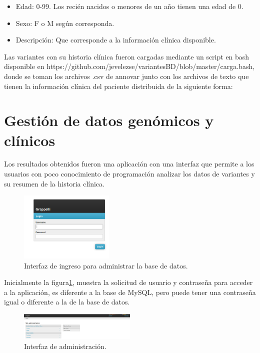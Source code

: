 \begin{itemize}
	\item Edad: 0-99. Los recién nacidos  o menores de un año tienen una edad de 0.
	\item Sexo: F o M según corresponda.
	\item Descripción: Que corresponde a la información clínica disponible.
\end{itemize} 


Las variantes con su historia clínica fueron cargadas mediante un script en bash disponible en https://github.com/jevelezse/variantesBD/blob/master/carga.bash, donde se toman los archivos .csv de annovar junto con los archivos de texto que tienen la información clínica del paciente distribuida de la siguiente forma:

\section{Gestión de datos genómicos y clínicos}

Los resultados obtenidos fueron una aplicación con una interfaz que permite a los usuarios con poco conocimiento de  programación  analizar los datos de variantes y su resumen de la historia clínica. \\

\begin{figure}[h] 
	\centering
	\includegraphics[width=0.4\textwidth]{Kap3/admin_django}
	\caption{Interfaz de ingreso para  administrar la base de datos.} \label{fig:admin}
\end{figure}

Inicialmente la figura\ref{fig:admin}, muestra la solicitud de usuario y contraseña para acceder a la aplicación, es diferente a la base de MySQL, pero  puede tener  una contraseña igual o diferente a la de la base de datos.

\begin{figure}[h] 
	\centering
	\includegraphics[width=0.5\textwidth]{Kap3/django_admin}
	\caption{Interfaz de administración.} \label{fig:admin2}
\end{figure}

